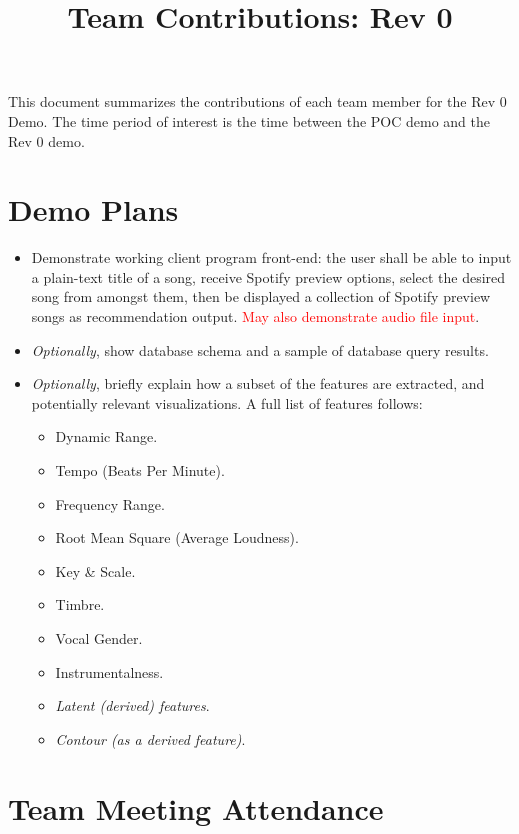 \documentclass{article}
\title{Team Contributions: Rev 0\\\progname}
\author{\authname}
\date{}
\begin{document}
\maketitle

This document summarizes the contributions of each team member for the Rev 0
Demo.  The time period of interest is the time between the POC demo and the Rev
0 demo.

\section{Demo Plans}

\begin{itemize}
    \item Demonstrate working client program front-end: the user shall be able to input a plain-text title of a song, receive Spotify preview options, select the desired song from amongst them, then be displayed a collection of Spotify preview songs as recommendation output. \textcolor{red}{May also demonstrate audio file input}.
    \item \emph{Optionally}, show database schema and a sample of database query results.
    \item \emph{Optionally}, briefly explain how a subset of the features are extracted, and potentially relevant visualizations. A full list of features follows:
    \begin{itemize}
        \item Dynamic Range.
        \item Tempo (Beats Per Minute).
        \item Frequency Range.
        \item Root Mean Square (Average Loudness).
        \item Key \& Scale.
        \item Timbre.
        \item Vocal Gender.
        \item Instrumentalness.
        \item \emph{Latent (derived) features}.
        \item \emph{Contour (as a derived feature)}.
    \end{itemize}
\end{itemize}

\section{Team Meeting Attendance}
\end{document}
